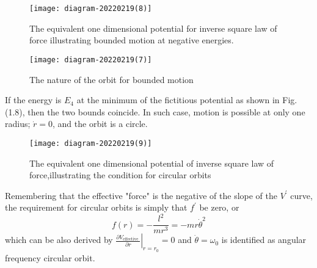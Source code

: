 \begin{minipage}{0.5\textwidth}
	\begin{figure}[H]
		\centering
		\texttt{[image: diagram-20220219(8)]}
		\caption{The equivalent one dimensional potential for inverse square law of force illustrating bounded motion at negative energies.}
		\label{}
	\end{figure}
\end{minipage}
\begin{minipage}{0.5\textwidth}
\begin{figure}[H]
	\centering
	\texttt{[image: diagram-20220219(7)]}
	\caption{The nature of the orbit for bounded motion}
	\label{}
\end{figure}
\end{minipage}
\par If the energy is $E_{4}$ at the minimum of the fictitious potential as shown in Fig. (1.8), then the two bounds coincide. In such case, motion is possible at only one radius; $\dot{r}=0$, and the orbit is a circle.
\begin{figure}[H]
	\centering
	\texttt{[image: diagram-20220219(9)]}
	\caption{The equivalent one dimensional potential of inverse square law of force,illustrating the condition for circular orbits}
	\label{}
\end{figure}
\begin{note}
Remembering that the effective "force" is the negative of the slope of the $V^{\prime}$ curve, the requirement for circular orbits is simply that $f^{\prime}$ be zero, or
$$
f(r)=-\frac{l^{2}}{m r^{3}}=-m r \dot{\theta}^{2}
$$
which can be also derived by $\left.\frac{\partial V_{\text {effective }}}{\partial r}\right|_{r=r_{0}}=0$ and $\dot{\theta}=\omega_{0}$ is identified as angular frequency circular orbit.	
\end{note}

